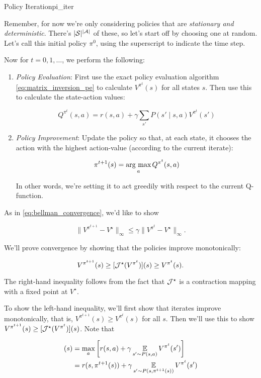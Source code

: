 \documentclass[../main/main]{subfiles}
\begin{document}
\begin{theorem}{Policy Iteration}{pi_iter}

Remember, for now we're only considering policies that are \emph{stationary and deterministic}. There's $|\mathcal{S}|^{|\mathcal{A}|}$ of these, so let's start off by choosing one at random. Let's call this initial policy $\pi^0$, using the superscript to indicate the time step.

Now for $t = 0, 1, \dots$, we perform the following:

\begin{enumerate}
    
\item \emph{Policy Evaluation}: First use the exact policy evaluation algorithm \ref{eq:matrix_inversion_pe} to calculate $V^{\pi^t}(s)$ for all states $s$. Then use this to calculate the state-action values:

    \[
        Q^{\pi^t}(s, a) = r(s, a) + \gamma \sum_{s'} P(s' \mid s, a) V^{\pi^t} (s')
    \]

\item \emph{Policy Improvement}: Update the policy so that, at each state,
    it chooses the action with the highest action-value (according to the current iterate):

    \[
        \pi^{t+1}(s) = \operatorname*{\textrm{arg\ max}}_a Q^{\pi^t} (s, a)
    \]

    In other words, we're setting it to act greedily with respect to the current Q-function.
\end{enumerate}


As in \ref{eq:bellman_convergence}, we'd like to show

\[
    \|V^{\pi^{t+1}} - V^\star \|_{\infty} \le \gamma \|V^{\pi^{t}} - V^\star \|_{\infty}.
\]

We'll prove convergence by showing that the policies improve monotonically:

\[
    V^{\pi^{t+1}}(s) \ge [\mathcal{J}^{\star}(V^{\pi^{t}})](s) \ge V^{\pi^{t}}(s).
\]

The right-hand inequality follows from the fact that $\mathcal{J}^{\star}$ is a contraction mapping with a fixed point at $V^{\star}$.

To show the left-hand inequality, we'll first show that iterates improve monotonically, that is, $V^{\pi^{t+1}}(s) \ge V^{\pi^{t}}(s)$ for all $s$. Then we'll use this to show $V^{\pi^{t+1}}(s) \ge [\mathcal{J}^{\star}(V^{\pi^{t}})](s)$. Note that

\begin{align*}
    [\bop^{\star} (V^{\pi^{t}})](s) &= \max_a \left[ r(s, a) + \gamma \E_{s' \sim P(s, a)} V^{\pi^{t}}(s') \right] \\
    &= r(s, \pi^{t+1}(s)) + \gamma \E_{s' \sim P(s, \pi^{t+1}(s))} V^{\pi^{t}}(s')
\end{align*}


\end{theorem}
\end{document}
